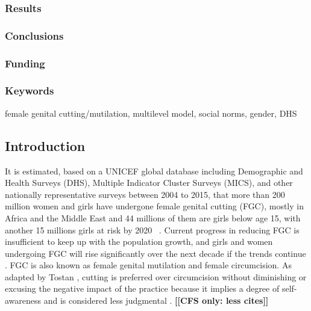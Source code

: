 \documentclass[12pt,]{article}
\newcommand{\comment}[1]{\textbf{[[#1]]}}
\newcommand{\cfonly}[1]{\comment{CFS only: #1}}
\begin{document}
\subsubsection{Results}\label{results}

\subsubsection{Conclusions}\label{conclusions}

\subsubsection{Funding}\label{funding}

\subsubsection{Keywords}\label{keywords}

female genital cutting/mutilation, multilevel model, social norms, gender, DHS

\subsection{Introduction}\label{introduction}

It is estimated, based on a UNICEF global database including Demographic and Health Surveys (DHS), Multiple Indicator Cluster Surveys (MICS),  and other nationally representative surveys between 2004 to 2015, that more than 200 million women and girls have undergone female genital cutting (FGC), mostly in Africa and the Middle East and 44 millions of them are girls below age 15, with another 15 millions girls at risk by 2020  \cite{AdnrLesc16, UNIC16}.  Current progress in reducing FGC is insufficient to keep up with the population growth, and girls and women undergoing FGC will rise significantly over the next decade if the trends continue \cite{KhosBane17, UNIC16}.  FGC is also known as female genital mutilation and female circumcision.  As adapted by Tostan \cite{Tost15}, cutting is preferred over circumcision without diminishing or excusing the negative impact of the practice because it implies a degree of self-awareness and is considered less judgmental  \cite{KhahBark09, JohnEsse10, Meye00, PariSaru18, Shel01, Tost15}. \cfonly{less cites}
\end{document}
